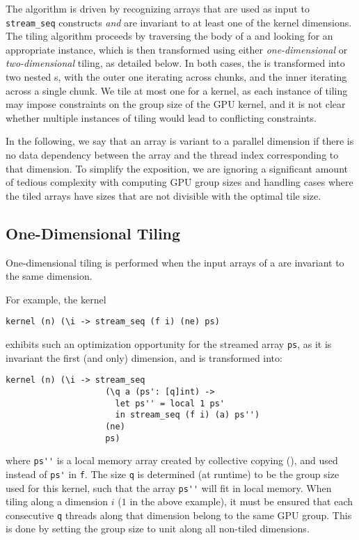 The algorithm is driven by recognizing arrays that are used as input
to \lstinline{stream_seq} constructs \textit{and} are invariant to at
least one of the kernel dimensions.  The tiling algorithm proceeds by
traversing the body of a  and looking for an appropriate
\StreamSeq{} instance, which is then transformed using either
\textit{one-dimensional} or \textit{two-dimensional} tiling, as
detailed below.  In both cases, the \StreamSeq{} is transformed into
two nested \StreamSeq{}s, with the outer one iterating across chunks,
and the inner iterating across a single chunk.  We tile at most one
\StreamSeq{} for a kernel, as each instance of tiling may impose
constraints on the group size of the GPU kernel, and it is not clear
whether multiple instances of tiling would lead to conflicting
constraints.

In the following, we say that an array is variant to a parallel
dimension if there is no data dependency between the array and the
thread index corresponding to that dimension.  To simplify the
exposition, we are ignoring a significant amount of tedious complexity
with computing GPU group sizes and handling cases where the tiled
arrays have sizes that are not divisible with the optimal tile size.

\subsection{One-Dimensional Tiling}
\label{sec:one-dimensional-tiling}

One-dimensional tiling is performed when the input arrays of a
\StreamSeq{} are invariant to the same dimension.

For example, the kernel
\begin{lstlisting}[xleftmargin=0.5cm]
kernel (n) (\i -> stream_seq (f i) (ne) ps)
\end{lstlisting}

\noindent exhibits such an optimization opportunity for the streamed
array \lstinline{ps}, as it is invariant the first (and only)
dimension, and is transformed into:

\begin{lstlisting}[xleftmargin=0.5cm]
kernel (n) (\i -> stream_seq
                    (\q a (ps': [q]int) ->
                      let ps'' = local 1 ps'
                      in stream_seq (f i) (a) ps'')
                    (ne)
                    ps)
\end{lstlisting}

\noindent where \lstinline{ps''} is a local memory array created by
collective copying (), and used instead of \lstinline{ps'}
in \lstinline{f}.  The size \lstinline{q} is determined (at runtime)
to be the group size used for this kernel, such that the array
\lstinline{ps''} will fit in local memory.  When tiling along a
dimension $i$ ($1$ in the above example), it must be ensured that each
consecutive \lstinline{q} threads along that dimension belong to the
same GPU group.  This is done by setting the group size to unit along
all non-tiled dimensions.

